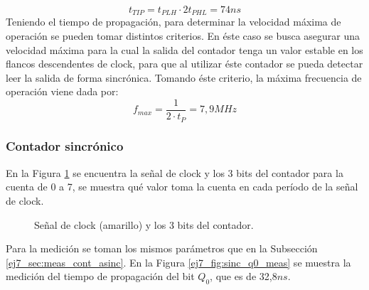  \begin{equation}
     t_{TIP} = t_{PLH}\cdot 2 t_{PHL} = 74ns
 \end{equation}
 Teniendo el tiempo de propagaci\'on, para determinar la velocidad m\'axima de operaci\'on se pueden tomar distintos criterios. En \'este caso se busca asegurar una velocidad m\'axima para la cual la salida del contador tenga un valor estable en los flancos descendentes de clock, para que al utilizar \'este contador se pueda detectar leer la salida de forma sincr\'onica. Tomando \'este criterio, la m\'axima frecuencia de operaci\'on viene dada por:
 \begin{equation}
     f_{max} = \frac{1}{2\cdot t_{P}} = 7,9MHz
     \label{ej7_eq:vel_max}
 \end{equation}
\subsubsection{Contador sincr\'onico}
\noindent
En la Figura \ref{ej7_fig:sinc_allbits} se encuentra la señal de clock y los 3 bits del contador para la cuenta de 0 a 7, se muestra qu\'e valor toma la cuenta en cada per\'iodo de la señal de clock.
%
\begin{figure}[H]
	\centering
	\caption{Señal de clock (amarillo) y los 3 bits del contador.}
	\label{ej7_fig:sinc_allbits}
\end{figure}
%
\noindent
Para la medici\'on se toman los mismos par\'ametros que en la Subsecci\'on \ref{ej7_sec:meas_cont_asinc}. En la Figura \ref{ej7_fig:sinc_q0_meas} se muestra la medici\'on del tiempo de propagaci\'on del bit $Q_0$, que es de 32,8$ns$. 
%

